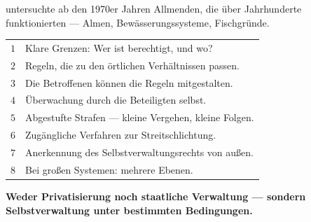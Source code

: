 \begin{merksatz}
\begin{center}
\begin{minipage}{0.88\textwidth}
\end{minipage}
\end{center}
\end{merksatz}

\begin{merksatz}
 untersuchte ab den 1970er Jahren Allmenden, die über Jahrhunderte funktionierten --- Almen, Bewässerungssysteme, Fischgründe.

\begin{center}
{\small
\renewcommand{\arraystretch}{1.48}
\begin{tabular}{@{}P{0.8cm}P{7.6cm}@{}}
\toprule
$1$ & Klare Grenzen: Wer ist berechtigt, und wo?\\
$2$ & Regeln, die zu den örtlichen Verhältnissen passen.\\
$3$ & Die Betroffenen können die Regeln mitgestalten.\\
$4$ & Überwachung durch die Beteiligten selbst.\\
$5$ & Abgestufte Strafen --- kleine Vergehen, kleine Folgen.\\
$6$ & Zugängliche Verfahren zur Streitschlichtung.\\
$7$ & Anerkennung des Selbstverwaltungsrechts von außen.\\
$8$ & Bei großen Systemen: mehrere Ebenen.\\
\bottomrule
\end{tabular}}
\end{center}

\begin{center}
\begin{minipage}{0.9\textwidth}
\textbf{Weder Privatisierung noch staatliche Verwaltung --- sondern Selbstverwaltung unter bestimmten Bedingungen.}
\end{minipage}
\end{center}

\begin{center}
\begin{minipage}{0.88\textwidth}
\end{minipage}
\end{center}
\end{merksatz}

